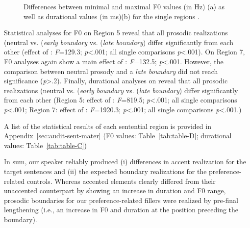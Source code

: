 \documentclass[fleqn,reqno,10pt,draft]{article}
\begin{document}
\begin{figure}[ht]
{
	    \label{fig:duration_fi}
	}
	\caption[]{Differences between minimal and maximal F0 values (in Hz) (a) as well
	as durational values (in ms)(b) for 
	the single regions  .}
	\label{fig:acoustics_fi}
\end{figure}


Statistical analyses for F0 on Region 5 reveal that all prosodic realizations
(neutral vs. (\emph{early boundary} vs. (\emph{late boundary}) differ significantly
from each other (effect of : \emph{F}=129.3; \emph{p}<.001; all
single comparisons \emph{p}<.001). On Region 7, F0 analyses again show a main
effect of : \emph{F}=132.5; \emph{p}<.001. However, the comparison
between neutral prosody and a \emph{late boundary} did not reach significance 
(\emph{p}>.2). Finally, durational analyses on reveal that all prosodic realizations
(neutral vs. (\emph{early boundary} vs. (\emph{late boundary}) differ significantly
from each other (Region 5: effect of : \emph{F}=819.5; \emph{p}<.001; all
single comparisons \emph{p}<.001; Region 7: effect of : \emph{F}=1920.3; 
\emph{p}<.001; all single comparisons \emph{p}<.001.)

A list of the statistical results of each sentential region is provided in 
Appendix~\ref{sec:audit-sent-mater} (F0 values: Table~\ref{tab:table-D};
durational values: Table~\ref{tab:table-C})


In sum, our speaker reliably
produced (i) differences in accent realization for the target
sentences and (ii) the expected boundary realizations for the
preference-related controls. Whereas accented elements clearly
differed from their unaccented counterpart by showing an increase in
duration and F0 range, prosodic boundaries for our preference-related
fillers were realized by pre-final lengthening (i.e., an increase in F0
and duration at the position preceding the boundary).
\end{document}
